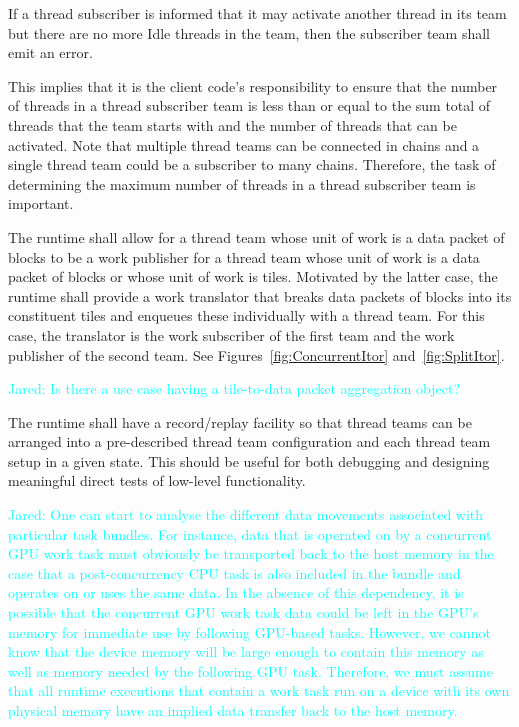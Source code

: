 \documentclass{article}
\newcommand{\Jared}[1]          {\textcolor{cyan}{Jared: #1}}
\begin{document}
\begin{req}
\label{req:ThreadBalance}
If a thread subscriber is informed that it may activate another thread in its
team but there are no more Idle threads in the team, then the subscriber team
shall emit an error.
\end{req}

This implies that it is the client code's responsibility to ensure that the
number of threads in a thread subscriber team is less than or equal to the sum
total of threads that the team starts with and the number of threads that can be
activated.  Note that multiple thread teams can be connected in chains and a
single thread team could be a subscriber to many chains.  Therefore, the task of
determining the maximum number of threads in a thread subscriber team is important.

\begin{req}
The runtime shall allow for a thread team whose unit of work is a data packet of
blocks to be a work publisher for a thread team whose unit of work is a data
packet of blocks or whose unit of work is tiles.  Motivated by the latter case,
the runtime shall provide a work translator that breaks data packets of blocks into its
constituent tiles and enqueues these individually with a thread team.  For this
case, the translator is the work subscriber of the first team and the work
publisher of the second team.  See Figures~\ref{fig:ConcurrentItor}
and~\ref{fig:SplitItor}.
\end{req}

\Jared{Is there a use case having a tile-to-data packet aggregation
object?}

\begin{req}
The runtime shall have a record/replay facility so that thread teams can be
arranged into a pre-described thread team configuration and each thread team setup in a given
state.  This should be useful for both debugging and designing meaningful direct
tests of low-level functionality.
\end{req}

\Jared{One can start to analyse the different data movements associated with particular
task bundles.  For instance, data that is operated on by a concurrent GPU work
task must obviously be transported back to the host memory in the case that a
post-concurrency CPU task is also included in the bundle and operates on or uses
the same data.  In the absence of this dependency, it is possible that the
concurrent GPU work task data could be left in the GPU's memory for immediate
use by following GPU-based tasks.  However, we cannot know that the device
memory will be large enough to contain this memory as well as memory needed by
the following GPU task.  Therefore, we must assume that all runtime executions
that contain a work task run on a device with its own physical memory have an
implied data transfer back to the host memory.}\\
\end{document}
